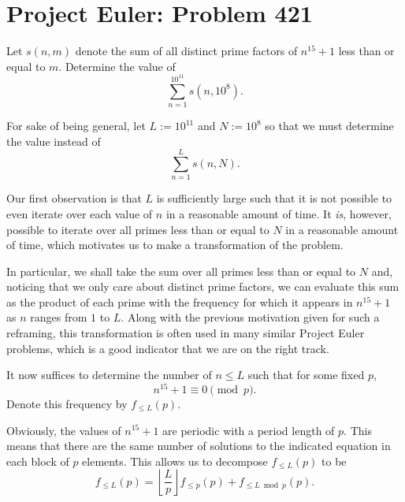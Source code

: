 \documentclass[a4paper, 12pt]{article}
\begin{document}
\section*{Project Euler: Problem 421}

\begin{sidebox}
    \begin{problem}
        Let \( s(n, m) \) denote the sum of all distinct prime factors of \( n^{15} + 1 \) less than or equal to \( m \). Determine the value of
        \[
            \sum_{n = 1}^{10^{11}} s(n, 10^8)
        .\]
    \end{problem}
\end{sidebox}

\begin{solution}
    For sake of being general, let \( L := 10^{11} \) and \( N := 10^8 \) so that we must determine the value instead of
    \[
        \sum_{n = 1}^{L} s(n, N)
    .\]

    \begin{observation}
    Our first observation is that \( L \) is sufficiently large such that it is not possible to even iterate over each value of \( n \) in a reasonable amount of time. It \textit{is}, however, possible to iterate over all primes less than or equal to \( N \) in a reasonable amount of time, which motivates us to make a transformation of the problem.

    In particular, we shall take the sum over all primes less than or equal to \( N \) and, noticing that we only care about distinct prime factors, we can evaluate this sum as the product of each prime with the frequency for which it appears in \( n^{15} + 1 \) as \( n \) ranges from \( 1 \) to \( L \). Along with the previous motivation given for such a reframing, this transformation is often used in many similar Project Euler problems, which is a good indicator that we are on the right track.
    \end{observation}

    It now suffices to determine the number of \( n \le L \) such that for some fixed \( p \),
    \[
        n^{15} + 1 \equiv 0 \pmod{p}
    .\]
    Denote this frequency by \( f_{\le L}(p) \).
    
    \begin{observation}
        Obviously, the values of \( n^{15} + 1 \) are periodic with a period length of \( p \). This means that there are the same number of solutions to the indicated equation in each block of \( p \) elements. This allows us to decompose \( f_{\le L}(p) \) to be
        \[
            f_{\le L}(p) = \left\lfloor \frac{L}{p} \right\rfloor f_{\le p}(p) + f_{\le L \bmod p}(p)
        .\]
    \end{observation}


\end{solution}
\end{document}
